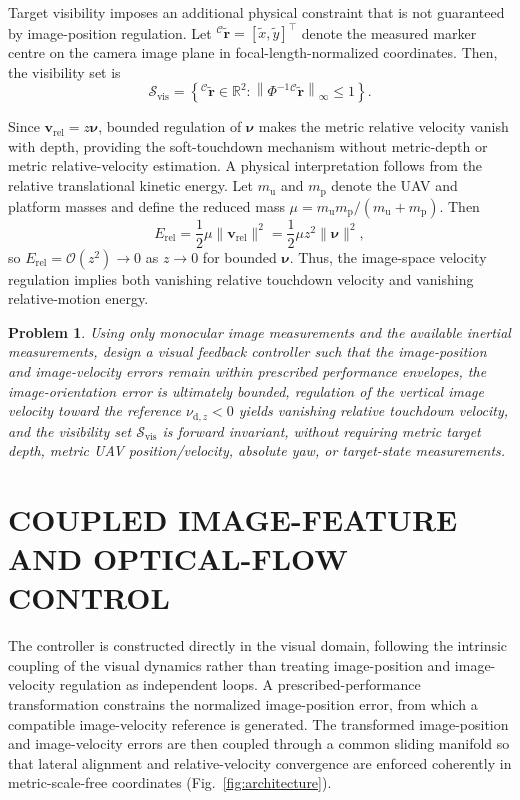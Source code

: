 \documentclass[10pt,conference]{IEEEtran}
\newtheorem{problem}{Problem}
\begin{document}
Target visibility imposes an additional physical constraint that is not guaranteed by image-position regulation. Let ${}^{\mathcal C}\tilde{\boldsymbol r} = [\tilde{x},\tilde{y}]^\top$ denote the measured marker centre on the camera image plane in focal-length-normalized coordinates. Then, the visibility set is 
\begin{equation}
    \mathcal S_{\mathrm{vis}} = \left\{{}^{\mathcal C}\tilde{\boldsymbol r}\in\mathbb R^2:\left\| \Phi^{-1}{}^{\mathcal C}\tilde{\boldsymbol r} \right\|_\infty \le 1 \right\}.
    \label{visibility set: equation}
\end{equation}

Since $\boldsymbol v_{\mathrm{rel}}=z\boldsymbol\nu$, bounded regulation of $\boldsymbol\nu$ makes the metric relative velocity vanish with depth, providing the soft-touchdown mechanism without metric-depth or metric relative-velocity estimation. A physical interpretation follows from the relative translational kinetic energy. Let $m_{\mathrm u}$ and $m_{\mathrm p}$ denote the UAV and platform masses and define the reduced mass $\mu=m_{\mathrm u}m_{\mathrm p}/(m_{\mathrm u}+m_{\mathrm p})$. Then
\begin{equation}
E_{\mathrm{rel}}=\frac12\mu\|\boldsymbol v_{\mathrm{rel}}\|^2
=\frac12\mu z^2\|\boldsymbol\nu\|^2,
\label{relative touchdown energy: equation}
\end{equation}
so $E_{\mathrm{rel}}=\mathcal O(z^2)\to0$ as $z\to0$ for bounded $\boldsymbol\nu$. Thus, the image-space velocity regulation implies both vanishing relative touchdown velocity and vanishing relative-motion energy.

\begin{problem}
\label{prob:landing}
Using only monocular image measurements and the available inertial measurements, design a visual feedback controller such that the image-position and image-velocity errors remain within prescribed performance envelopes, the image-orientation error is ultimately bounded, regulation of the vertical image velocity toward the reference $\nu_{\mathrm d,z}<0$ yields vanishing relative touchdown velocity, and the visibility set $\mathcal S_{\mathrm{vis}}$ is forward invariant, without requiring metric target depth, metric UAV position/velocity, absolute yaw, or target-state measurements.
\end{problem}

\section{COUPLED IMAGE-FEATURE AND OPTICAL-FLOW CONTROL}
\label{sec:control}
The controller is constructed directly in the visual domain, following the intrinsic coupling of the visual dynamics rather than treating image-position and image-velocity regulation as independent loops. A prescribed-performance transformation constrains the normalized image-position error, from which a compatible image-velocity reference is generated. The transformed image-position and image-velocity errors are then coupled through a common sliding manifold so that lateral alignment and relative-velocity convergence are enforced coherently in metric-scale-free coordinates (Fig.~\ref{fig:architecture}).
\end{document}
